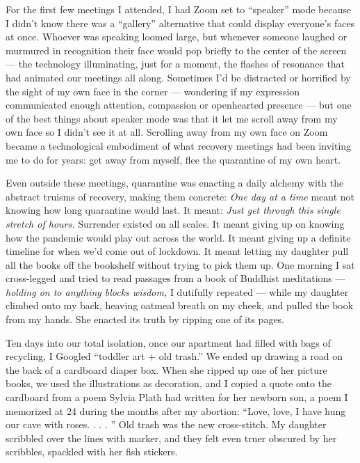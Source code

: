 For the first few meetings I attended, I had Zoom set to ``speaker''
mode because I didn't know there was a ``gallery'' alternative that
could display everyone's faces at once. Whoever was speaking loomed
large, but whenever someone laughed or murmured in recognition their
face would pop briefly to the center of the screen --- the technology
illuminating, just for a moment, the flashes of resonance that had
animated our meetings all along. Sometimes I'd be distracted or
horrified by the sight of my own face in the corner --- wondering if my
expression communicated enough attention, compassion or openhearted
presence --- but one of the best things about speaker mode was that it
let me scroll away from my own face so I didn't see it at all. Scrolling
away from my own face on Zoom became a technological embodiment of what
recovery meetings had been inviting me to do for years: get away from
myself, flee the quarantine of my own heart.

Even outside these meetings, quarantine was enacting a daily alchemy
with the abstract truisms of recovery, making them concrete: \emph{One
day at a time} meant not knowing how long quarantine would last. It
meant: \emph{Just get through this single stretch of hours.} Surrender
existed on all scales. It meant giving up on knowing how the pandemic
would play out across the world. It meant giving up a definite timeline
for when we'd come out of lockdown. It meant letting my daughter pull
all the books off the bookshelf without trying to pick them up. One
morning I sat cross-legged and tried to read passages from a book of
Buddhist meditations --- \emph{holding on to anything blocks wisdom,} I
dutifully repeated --- while my daughter climbed onto my back, heaving
oatmeal breath on my cheek, and pulled the book from my hands. She
enacted its truth by ripping one of its pages.

Ten days into our total isolation, once our apartment had filled with
bags of recycling, I Googled ``toddler art + old trash.'' We ended up
drawing a road on the back of a cardboard diaper box. When she ripped up
one of her picture books, we used the illustrations as decoration, and I
copied a quote onto the cardboard from a poem Sylvia Plath had written
for her newborn son, a poem I memorized at 24 during the months after my
abortion: ``Love, love, I have hung our cave with roses. . . . '' Old
trash was the new cross-stitch. My daughter scribbled over the lines
with marker, and they felt even truer obscured by her scribbles,
spackled with her fish stickers.


